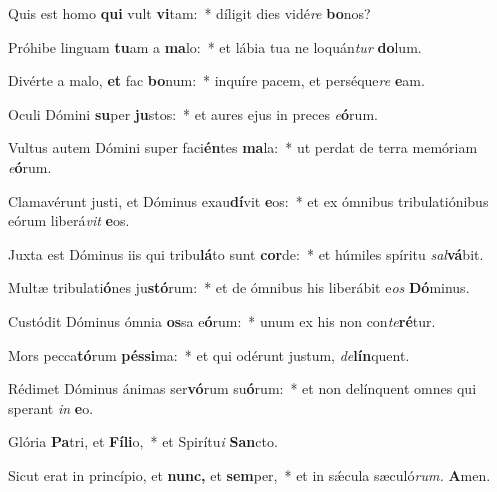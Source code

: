 \item Quis est homo \textbf{qui} vult \textbf{vi}tam:~* díligit dies vidé\hspace{0.03em}\textit{re} \textbf{bo}nos?
\item Próhibe linguam \textbf{tu}am a \textbf{ma}lo:~* et lábia tua ne loquán\textit{tur} \textbf{do}lum.
\item Divérte a malo, \textbf{et} fac \textbf{bo}num:~* inquíre pacem, et perséque\hspace{0.03em}\textit{re} \textbf{e}am.
\item Oculi Dómini \textbf{su}per \textbf{ju}stos:~* et aures ejus in preces \textit{e}\textbf{ó}rum.
\item Vultus autem Dómini super faci\textbf{én}tes \textbf{ma}la:~* ut perdat de terra memóriam \textit{e}\textbf{ó}rum.
\item Clamavérunt justi, et Dóminus exau\textbf{dí}vit \textbf{e}os:~* et ex ómnibus tribulatiónibus eórum liberá\textit{vit} \textbf{e}os.
\item Juxta est Dóminus iis qui tribu\textbf{lá}to sunt \textbf{cor}de:~* et húmiles spíritu \textit{sal}\textbf{vá}bit.
\item Multæ tribulati\textbf{ó}nes ju\textbf{stó}rum:~* et de ómnibus his liberábit e\hspace{0.03em}\textit{os} \textbf{Dó}minus.
\item Custódit Dóminus ómnia \textbf{os}sa e\textbf{ó}rum:~* unum ex his non con\hspace{0.03em}\textit{te}\textbf{ré}tur.
\item Mors pecca\textbf{tó}rum \textbf{pés}\textbf{si}ma:~* et qui odérunt ju\-stum, \textit{de}\textbf{lín}quent.
\item Rédimet Dóminus ánimas ser\textbf{vó}rum su\textbf{ó}rum:~* et non delínquent o\-mnes qui sperant \textit{in} \textbf{e}o.
\item Glória \textbf{Pa}tri, et \textbf{Fí}\textbf{li}o,~* et Spirítu\textit{i} \textbf{San}cto.
\item Sicut erat in princípio, et \textbf{nunc,} et \textbf{sem}per,~* et in sǽcula sæculó\textit{rum.} \textbf{A}men.

